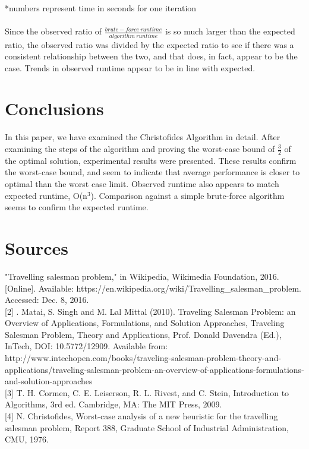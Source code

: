\documentclass[12pt, oneside]{article}   	%
\begin{document}
*numbers represent time in seconds for one iteration\\\\

\indent Since the observed ratio of $\frac{brute-force\ runtime}{algorithm\ runtime}$ is so much larger than the expected ratio, the observed ratio was divided by the expected ratio to see if there was a consistent relationship between the two, and that does, in fact, appear to be the case.  Trends in observed runtime appear to be in line with expected.\\
\section{Conclusions}
\indent\indent In this paper, we have examined the Christofides Algorithm in detail.  After examining the steps of the algorithm and proving the worst-case bound of $\frac{3}{2}$ of the optimal solution, experimental results were presented.  These results confirm the worst-case bound, and seem to indicate that average performance is closer to optimal than the worst case limit.  Observed runtime also appears to match expected runtime, O(n$^3$).  Comparison against a simple brute-force algorithm seems to confirm the expected runtime.
\newpage



\section{Sources}
\indent\indent  [1]	"Travelling salesman problem," in Wikipedia, Wikimedia Foundation, 2016. [Online]. Available: https://en.wikipedia.org/wiki/Travelling\_salesman\_problem. Accessed: Dec. 8, 2016.\\

[2] . Matai, S. Singh and M. Lal Mittal (2010). Traveling Salesman Problem: an Overview of Applications, Formulations, and Solution Approaches, Traveling Salesman Problem, Theory and Applications, Prof. Donald Davendra (Ed.), InTech, DOI: 10.5772/12909. Available from: http://www.intechopen.com/books/traveling-salesman-problem-theory-and-applications/traveling-salesman-problem-an-overview-of-applications-formulations-and-solution-approaches\\

[3]	T. H. Cormen, C. E. Leiserson, R. L. Rivest, and C. Stein, Introduction to Algorithms, 3rd ed. Cambridge, MA: The MIT Press, 2009.\\

[4] N. Christofides, Worst-case analysis of a new heuristic for the travelling salesman problem, Report 388, Graduate School of Industrial Administration, CMU, 1976.\\
\end{document}
